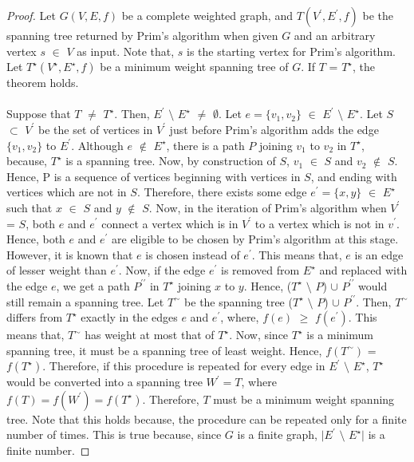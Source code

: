 \documentclass[12pt]{article}
\numberwithin{equation}{subsection}
\numberwithin{table}{subsection}
\numberwithin{algorithm}{subsection}
\begin{document}
\begin{proof}
Let $G(V,E,f)$ be a complete weighted graph, and $T(V^\prime,E^\prime,f)$ be the spanning tree returned by Prim's algorithm when given $G$ and an arbitrary vertex $s$ $\in$ $V$ as input. Note that, $s$ is the starting vertex for Prim's algorithm. Let $T^\star(V^\star,E^\star,f)$ be a minimum weight spanning tree of $G$. If $T$ = $T^\star$, the theorem holds.\\\\
Suppose that $T$ $\neq$ $T^\star$. Then,  $E^\prime$ $\setminus$ $E^\star$ $\neq$ $\emptyset$. Let $e = \{v_1, v_2\}$ $\in$  $E^\prime$ $\setminus$ $E^\star$. Let $S$ $\subset$ $V^\prime$ be the set of vertices in $V^\prime$ just before Prim's algorithm adds the edge $\{v_1, v_2\}$ to $E^\prime$. Although $e$ $\notin$ $E^\star$, there is a path $P$ joining $v_1$ to $v_2$ in $T^\star$, because, $T^\star$ is a spanning tree. Now, by construction of $S$, $v_1$ $\in$ $S$ and $v_2$ $\notin$ $S$. Hence, P is a sequence of vertices beginning with vertices in $S$, and ending with vertices which are not in $S$. Therefore, there exists some edge $e^\prime = \{x,y\}$ $\in$ $E^\star$ such that $x$ $\in$ $S$ and $y$ $\notin$ $S$. Now, in the iteration of Prim's algorithm when $V^\prime$ = $S$, both $e$ and $e^\prime$ connect a vertex which is in $V^\prime$ to a vertex which is not in $v^\prime$. Hence, both $e$ and $e^\prime$ are eligible to be chosen by Prim's algorithm at this stage. However, it is known that $e$ is chosen instead of $e^\prime$. This means that, $e$ is an edge of lesser weight than $e^\prime$. Now, if the edge $e^\prime$ is removed from $E^\star$ and replaced with the edge $e$, we get a path $P^{\prime\prime}$ in $T^\star$ joining $x$ to $y$. Hence, ($T^\star$ $\setminus$ $P$) $\cup$ $P^{\prime\prime}$ would still remain a spanning tree. Let $T^\sim$ be the spanning tree ($T^\star$ $\setminus$ $P$) $\cup$ $P^{\prime\prime}$. Then, $T^\sim$ differs from $T^\star$ exactly in the edges $e$ and $e^\prime$, where, $f(e)$ $\geq$ $f(e^\prime)$. This means that, $T^\sim$ has weight at most that of $T^\star$. Now, since $T^\star$ is a minimum spanning tree, it must be a spanning tree of least weight. Hence, $f(T^\sim)$ = $f(T^\star)$. Therefore, if this procedure is repeated for every edge in $E^\prime$ $\setminus$ $E^\star$, $T^\star$ would be converted into a spanning tree $W^\prime = T$, where $f(T) = f(W^\prime) = f(T^\star)$. Therefore, $T$ must be a minimum weight spanning tree. Note that this holds because, the procedure can be repeated only for a finite number of times. This is true because, since $G$ is a finite graph, $|E^\prime$ $\setminus$ $E^\star|$ is a finite number.
\end{proof}
\end{document}
